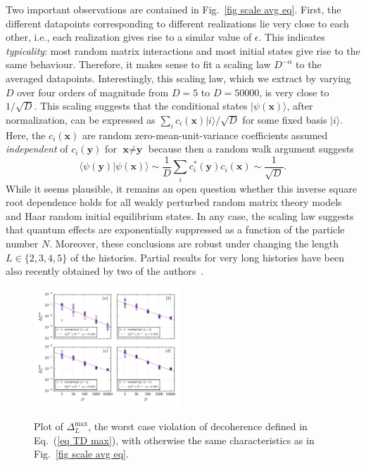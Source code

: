 \documentclass[pre,twocolumn,10pt,aps,longbibliography,nofootinbib]{revtex4-1}
\newcommand{\bb}[1]{\textbf{#1}}
\newcommand{\lr}[1]{{\langle {#1}\rangle}}
\newcommand{\new}[1]{#1}
\begin{document}
Two important observations are contained in Fig.~\ref{fig scale avg eq}. First, the different datapoints corresponding to different realizations lie very close to each other, i.e., each realization gives rise to a similar value of $\epsilon$. This indicates \emph{typicality}: most random matrix interactions and most initial states give rise to the same behaviour. Therefore, it makes sense to fit a scaling law $D^{-\alpha}$ to the averaged datapoints. Interestingly, this scaling law, which we extract by varying $D$ over four orders of magnitude from $D=5$ to $D=50000$, is very close to $1/\sqrt{D}$. \new{This scaling suggests that the conditional states $|\psi(\bb x)\rangle$, after normalization, can be expressed as $\sum_i c_i(\bb x)|i\rangle/\sqrt{D}$ for some fixed basis $|i\rangle$. Here, the $c_i(\bb x)$ are random zero-mean-unit-variance coefficients assumed \emph{independent} of $c_i(\bb y)$ for $\bb x\neq\bb y$ because then a random walk argument suggests
\begin{equation}
 \lr{\psi(\bb y)|\psi(\bb x)} \sim \frac{1}{D} \sum_i c_i^*(\bb y) c_i(\bb x) \sim \frac{1}{\sqrt{D}}.
\end{equation}
While it seems plausible, it remains an open question} whether this inverse square root dependence holds for all weakly perturbed random matrix theory models and Haar random initial equilibrium states. In any case, the scaling law suggests that quantum effects are exponentially suppressed as a function of the particle number $N$. Moreover, these conclusions are robust under changing the length $L\in\{2,3,4,5\}$ of the histories. \new{Partial results for very long histories have been also recently obtained by two of the authors~\cite{StrasbergSchindlerArXiv2023}.}

\begin{figure}[t]
 \centering\includegraphics[width=0.49\textwidth,clip=true]{Max_001_eq.pdf}
 \label{fig scale max eq}\vspace{-0.5cm}
 \caption{Plot of $\Delta_L^\text{max}$, the worst case violation of decoherence defined in Eq.~(\ref{eq TD max}), with otherwise the same characteristics as in Fig.~\ref{fig scale avg eq}.}
\end{figure}
\end{document}

